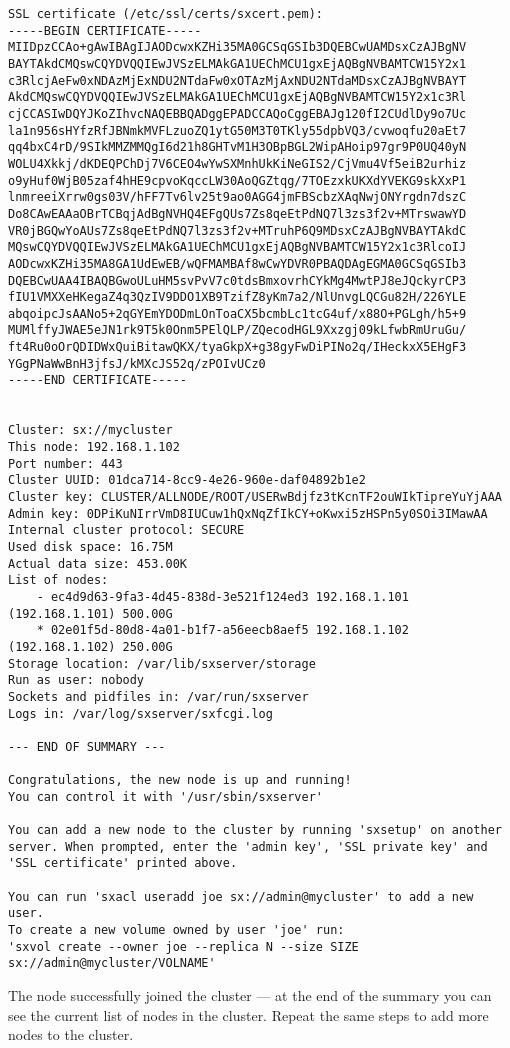 \begin{lstlisting}
SSL certificate (/etc/ssl/certs/sxcert.pem):
-----BEGIN CERTIFICATE-----
MIIDpzCCAo+gAwIBAgIJAODcwxKZHi35MA0GCSqGSIb3DQEBCwUAMDsxCzAJBgNV
BAYTAkdCMQswCQYDVQQIEwJVSzELMAkGA1UEChMCU1gxEjAQBgNVBAMTCW15Y2x1
c3RlcjAeFw0xNDAzMjExNDU2NTdaFw0xOTAzMjAxNDU2NTdaMDsxCzAJBgNVBAYT
AkdCMQswCQYDVQQIEwJVSzELMAkGA1UEChMCU1gxEjAQBgNVBAMTCW15Y2x1c3Rl
cjCCASIwDQYJKoZIhvcNAQEBBQADggEPADCCAQoCggEBAJg120fI2CUdlDy9o7Uc
la1n956sHYfzRfJBNmkMVFLzuoZQ1ytG50M3T0TKly55dpbVQ3/cvwoqfu20aEt7
qq4bxC4rD/9SIkMMZMMQgI6d21h8GHTvM1H3OBpBGL2WipAHoip97gr9P0UQ40yN
WOLU4Xkkj/dKDEQPChDj7V6CEO4wYwSXMnhUkKiNeGIS2/CjVmu4Vf5eiB2urhiz
o9yHuf0WjB05zaf4hHE9cpvoKqccLW30AoQGZtqg/7TOEzxkUKXdYVEKG9skXxP1
lnmreeiXrrw0gs03V/hFF7Tv6lv25t9ao0AGG4jmFBScbzXAqNwjONYrgdn7dszC
Do8CAwEAAaOBrTCBqjAdBgNVHQ4EFgQUs7Zs8qeEtPdNQ7l3zs3f2v+MTrswawYD
VR0jBGQwYoAUs7Zs8qeEtPdNQ7l3zs3f2v+MTruhP6Q9MDsxCzAJBgNVBAYTAkdC
MQswCQYDVQQIEwJVSzELMAkGA1UEChMCU1gxEjAQBgNVBAMTCW15Y2x1c3RlcoIJ
AODcwxKZHi35MA8GA1UdEwEB/wQFMAMBAf8wCwYDVR0PBAQDAgEGMA0GCSqGSIb3
DQEBCwUAA4IBAQBGwoULuHM5svPvV7c0tdsBmxovrhCYkMg4MwtPJ8eJQckyrCP3
fIU1VMXXeHKegaZ4q3QzIV9DDO1XB9TzifZ8yKm7a2/NlUnvgLQCGu82H/226YLE
abqoipcJsAANo5+2qGYEmYDODmLOnToaCX5bcmbLc1tcG4uf/x88O+PGLgh/h5+9
MUMlffyJWAE5eJN1rk9T5k0Onm5PElQLP/ZQecodHGL9Xxzgj09kLfwbRmUruGu/
ft4Ru0oOrQDIDWxQuiBitawQKX/tyaGkpX+g38gyFwDiPINo2q/IHeckxX5EHgF3
YGgPNaWwBnH3jfsJ/kMXcJS52q/zPOIvUCz0
-----END CERTIFICATE-----


Cluster: sx://mycluster
This node: 192.168.1.102
Port number: 443
Cluster UUID: 01dca714-8cc9-4e26-960e-daf04892b1e2
Cluster key: CLUSTER/ALLNODE/ROOT/USERwBdjfz3tKcnTF2ouWIkTipreYuYjAAA
Admin key: 0DPiKuNIrrVmD8IUCuw1hQxNqZfIkCY+oKwxi5zHSPn5y0SOi3IMawAA
Internal cluster protocol: SECURE
Used disk space: 16.75M
Actual data size: 453.00K
List of nodes:
    - ec4d9d63-9fa3-4d45-838d-3e521f124ed3 192.168.1.101 (192.168.1.101) 500.00G
    * 02e01f5d-80d8-4a01-b1f7-a56eecb8aef5 192.168.1.102 (192.168.1.102) 250.00G
Storage location: /var/lib/sxserver/storage
Run as user: nobody
Sockets and pidfiles in: /var/run/sxserver
Logs in: /var/log/sxserver/sxfcgi.log

--- END OF SUMMARY ---

Congratulations, the new node is up and running!
You can control it with '/usr/sbin/sxserver'

You can add a new node to the cluster by running 'sxsetup' on another
server. When prompted, enter the 'admin key', 'SSL private key' and
'SSL certificate' printed above.

You can run 'sxacl useradd joe sx://admin@mycluster' to add a new user.
To create a new volume owned by user 'joe' run:
'sxvol create --owner joe --replica N --size SIZE sx://admin@mycluster/VOLNAME'
\end{lstlisting}
The node successfully joined the cluster --- at the end of the summary you can
see the current list of nodes in the cluster. Repeat the same steps to add more
nodes to the cluster.

